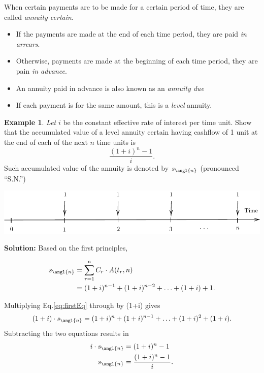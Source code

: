 \documentclass[
]{book}
\theoremstyle{definition}
\theoremstyle{definition}
\newtheorem{example}{Example}[chapter]
\theoremstyle{definition}
\theoremstyle{definition}
\theoremstyle{remark}
\begin{document}
When certain payments are to be made for a certain period of time, they are called \emph{annuity certain}.

\begin{itemize}
\item
  If the payments are made at the end of each time period, they are paid \emph{in arrears}.
\item
  Otherwise, payments are made at the beginning of each time period,
  they are pain \emph{in advance}.
\item
  An annuity paid in advance is also known as an \emph{annuity due}
\item
  If each payment is for the same amount, this is a \emph{level} annuity.
\end{itemize}

\begin{example}
\emph{Let} \(i\) be the constant effective rate of interest per time unit. Show
that the accumulated value of a level annuity certain having cashflow of
1 unit at the end of each of the next \(n\) time units is
\[\frac{(1+i)^n -1 }{i}.\] Such accumulated value of the annuity is
denoted by \(s_\angl{n}\) (pronounced ``S.N.'')
\end{example}

\begin{center}\includegraphics{SCMA266Bookdownproj_files/figure-latex/tikz-ex9-1} \end{center}

\textbf{Solution:} Based on the first principles,

\begin{align} 
 s_\angl{n} &= \sum_{r=1}^n C_r \cdot A(t_r,n) \\
    &= (1+i)^{n-1} + (1+i)^{n-2} + \ldots + (1+i) + 1. \label{eq:firstEq} 
\end{align}

Multiplying Eq.\eqref{eq:firstEq} through by (1+i) gives \begin{equation}
    (1+i) \cdot s_\angl{n}  = (1+i)^{n} + (1+i)^{n-1} + \ldots + (1+i)^2 + (1+i). 
\end{equation} Subtracting the two equations results in
\[\begin{aligned}
    i \cdot s_\angl{n} &= (1+i)^{n} - 1\\
        s_\angl{n} &= \frac{(1+i)^{n} - 1}{i}.\end{aligned}\]
\end{document}
